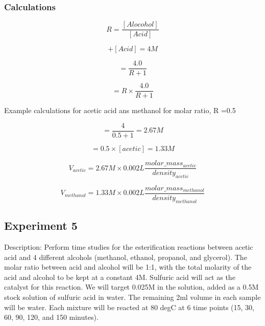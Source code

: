 \documentclass[sn-nature, twocolumn]{sn-jnl}%
\theoremstyle{thmstyleone}%
\theoremstyle{thmstyletwo}%
\theoremstyle{thmstylethree}%
\begin{document}
\subsubsection*{Calculations}

\begin{equation}
    R = \frac{[Alocohol]}{[Acid]}
\end{equation}

\begin{equation}
    [Alocohol] + [Acid] = 4M
\end{equation}

\begin{equation}
    [Acid] = \frac{4.0}{R+1}
\end{equation}

\begin{equation}
    [Alcohol] = R \times \frac{4.0}{R+1}
\end{equation}

\noindent Example calculations for acetic acid ans methanol for molar ratio, R =0.5

\begin{equation*}
    [acetic] = \frac{4}{0.5+1} = 2.67M
\end{equation*}

\begin{equation*}
    [methanol] = 0.5 \times [acetic] = 1.33M
\end{equation*}

\begin{equation*}
    V_{acetic} = 2.67 M \times 0.002 L \frac{molar\_mass_{acetic}}{density_{acetic}}
\end{equation*}


\begin{equation*}
    V_{methanol} = 1.33 M \times 0.002 L \frac{molar\_mass_{methanol}}{density_{methanol}}
\end{equation*}



\subsection{Experiment 5}
Description: Perform time studies for the esterification reactions between acetic acid and 4 different alcohols (methanol, ethanol, propanol, and glycerol).  The molar ratio between acid and alcohol will be 1:1, with the total molarity of the acid and alcohol to be kept at a constant 4M. Sulfuric acid will act as the catalyst for this reaction.  We will target 0.025M in the solution, added as a 0.5M stock solution of sulfuric acid in water.  The remaining 2ml volume in each sample will be water.  Each mixture will be reacted at 80 degC at 6 time points (15, 30, 60, 90, 120, and 150 minutes).
\end{document}
